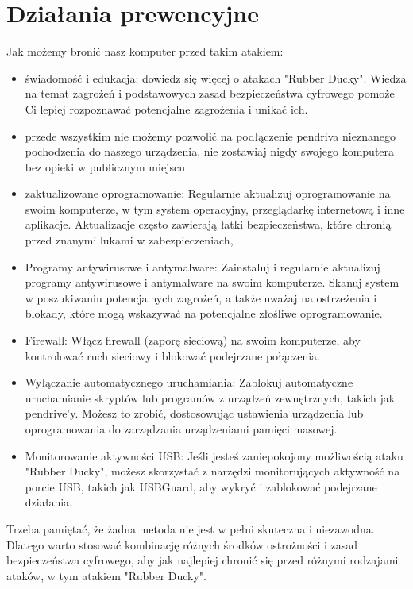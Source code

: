 \documentclass{article}
\begin{document}
\begin{itemize}
    
\end{itemize} 

\section{Działania prewencyjne}

Jak możemy bronić nasz komputer przed takim atakiem:
\begin{itemize}
    \item świadomość i edukacja: dowiedz się więcej o atakach "Rubber Ducky". Wiedza na temat zagrożeń i podstawowych zasad bezpieczeństwa cyfrowego pomoże Ci lepiej rozpoznawać potencjalne zagrożenia i unikać ich.
    \item przede wszystkim nie możemy pozwolić na podłączenie pendriva nieznanego pochodzenia do naszego urządzenia, nie zostawiaj nigdy swojego komputera bez opieki w publicznym miejscu
    \item zaktualizowane oprogramowanie: Regularnie aktualizuj oprogramowanie na swoim komputerze, w tym system operacyjny, przeglądarkę internetową i inne aplikacje. Aktualizacje często zawierają łatki bezpieczeństwa, które chronią przed znanymi lukami w zabezpieczeniach,
    \item Programy antywirusowe i antymalware: Zainstaluj i regularnie aktualizuj programy antywirusowe i antymalware na swoim komputerze. Skanuj system w poszukiwaniu potencjalnych zagrożeń, a także uważaj na ostrzeżenia i blokady, które mogą wskazywać na potencjalne złośliwe oprogramowanie.
    \item Firewall: Włącz firewall (zaporę sieciową) na swoim komputerze, aby kontrolować ruch sieciowy i blokować podejrzane połączenia.
    \item Wyłączanie automatycznego uruchamiania: Zablokuj automatyczne uruchamianie skryptów lub programów z urządzeń zewnętrznych, takich jak pendrive'y. Możesz to zrobić, dostosowując ustawienia urządzenia lub oprogramowania do zarządzania urządzeniami pamięci masowej.
    \item Monitorowanie aktywności USB: Jeśli jesteś zaniepokojony możliwością ataku "Rubber Ducky", możesz skorzystać z narzędzi monitorujących aktywność na porcie USB, takich jak USBGuard, aby wykryć i zablokować podejrzane działania.
\end{itemize}

Trzeba pamiętać, że żadna metoda nie jest w pełni skuteczna i niezawodna. Dlatego warto stosować kombinację różnych środków ostrożności i zasad bezpieczeństwa cyfrowego, aby jak najlepiej chronić się przed różnymi rodzajami ataków, w tym atakiem "Rubber Ducky".
\end{document}
